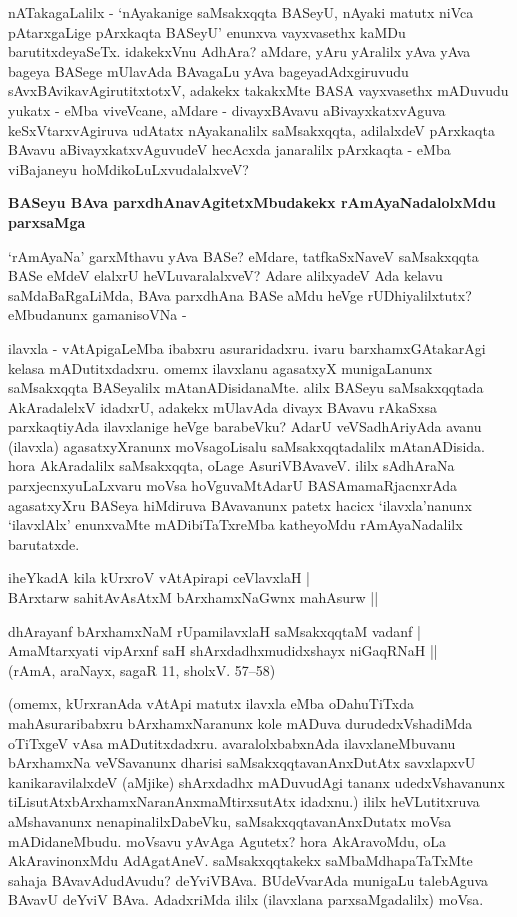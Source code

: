 nATakagaLalilx - `nAyakanige saMsakxqqta BASeyU, nAyaki matutx niVca pAtarxgaLige pArxkaqta BASeyU' enunxva vayxvasethx kaMDu barutitxdeyaSeTx. idakekxVnu AdhAra? aMdare, yAru yAralilx yAva yAva bageya BASege mUlavAda BAvagaLu yAva bageyadAdxgiruvudu sAvxBAvikavAgirutitxtotxV, adakekx takakxMte BASA vayxvasethx mADuvudu yukatx - eMba viveVcane, aMdare - divayxBAvavu aBivayxkatxvAguva keSxVtarxvAgiruva udAtatx nAyakanalilx saMsakxqqta, adilalxdeV pArxkaqta BAvavu aBivayxkatxvAguvudeV hecAcxda jana\-ralilx pArxkaqta - eMba viBajaneyu hoMdikoLuLxvudalalxveV?

{\bigskip
\noindent
{\large\bf BASeyu BAva parxdhAnavAgitetxMbudakekx rAmAyaNadalolxMdu parxsaMga}}\label{page13}
\medskip

\noindent
`rAmAyaNa' garxMthavu yAva BASe? eMdare, tatfkaSxNaveV saMsakxqqta BASe eMdeV elalxrU heVLuva\-ralalxveV? Adare alilxyadeV Ada kelavu saMdaBaRgaLiMda, BAva parxdhAna BASe aMdu heVge rUDhi\-yalilxtutx? eMbudanunx gamanisoVNa -

ilavxla - vAtApigaLeMba ibabxru asuraridadxru. ivaru barxhamxGAtakarAgi kelasa mADutitxdadxru. omemx ilavxlanu agasatxyX munigaLanunx saMsakxqqta BASeyalilx mAtanADisidanaMte. alilx BASeyu saMsakxqqtada AkAra\-dalelxV idadxrU, adakekx mUlavAda divayx BAvavu rAkaSxsa parxkaqtiyAda ilavxlanige heVge barabeVku? AdarU veVSadhAriyAda avanu (ilavxla) agasatxyXranunx moVsagoLisalu saMsakxqqtadalilx mAtanADisida. hora AkAradalilx saMsakxqqta, oLage AsuriVBAvaveV. ililx sAdhAraNa parxjecnxyuLaLxvaru moVsa hoVguvaMtAdarU BASAmamaRjacnxrAda agasatxyXru BASeya hiMdiruva BAvavanunx patetx hacicx `ilavxla'nanunx `ilavxlAlx' enunx\-vaMte mADibiTaTxreMba katheyoMdu rAmAyaNadalilx barutatxde.

\begin{shloka}
iheYkadA kila kUrxroV vAtApirapi ceVlavxlaH |\\\label{13}
BArxtarw sahitAvAsAtxM bArxhamxNaGwnx mahAsurw ||\\
\end{shloka} 

\begin{shloka}
dhArayanf bArxhamxNaM rUpamilavxlaH saMsakxqqtaM vadanf |\\
AmaMtarxyati vipArxnf saH shArxdadhxmudidxshayx niGaqRNaH ||\\[4pt]
\hfill{(rAmA, araNayx, sagaR 11, sholxV. 57--58)}
\end{shloka}  

\noindent
(omemx, kUrxranAda vAtApi matutx ilavxla eMba oDahuTiTxda mahAsura\-ribabxru bArxhamxNa\-ranunx kole mADuva durudedxVshadiMda oTiTxgeV vAsa mADutitxdadxru. avara\-lolxbabxnAda ilavxla\-neMbu\-vanu bArxhamxNa\- veVSavanunx dharisi saMsakxqqtavanAnxDutAtx savxlapxvU kanikaravilalxdeV (aMjike) shArxdadhx mADuvudAgi tananx udedxVsha\-vanunx tiLisutAtx\break bArxhamxNaranAnxmaMtirxsutAtx idadxnu.) ililx heVLutitxruva aMshavanunx nenapinalilxDa\-beVku, saMsakxqqtavanAnxDutatx moVsa mADidaneMbudu. moVsavu yAvAga Agutetx? hora AkAravoMdu, oLa AkAravinonxMdu AdAgatAneV. saMsakxqqtakekx saMbaMdhapaTaTxMte sahaja BAvavAdudAvudu? deYviVBAva. BUdeVvarAda munigaLu talebAguva BAvavU deYviV BAva. AdadxriMda ililx (ilavxlana parxsaMgadalilx) moVsa.

